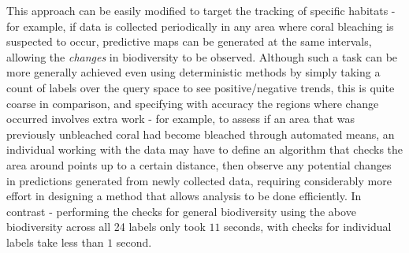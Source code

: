 This approach can be easily modified to target the tracking of specific habitats - for example, if data is collected periodically in any area where coral bleaching is suspected to occur, predictive maps can be generated at the same intervals, allowing the \textit{changes} in biodiversity to be observed. Although such a task can be more generally achieved even using deterministic methods by simply taking a count of labels over the query space to see positive/negative trends, this is quite coarse in comparison, and specifying with accuracy the regions where change occurred involves extra work - for example, to assess if an area that was previously unbleached coral had become bleached through automated means, an individual working with the data may have to define an algorithm that checks the area around points up to a certain distance, then observe any potential changes in predictions generated from newly collected data, requiring considerably more effort in designing a method that allows analysis to be done efficiently. In contrast - performing the checks for general biodiversity using the above biodiversity across all 24 labels only took $11$ seconds, with checks for individual labels take less than $1$ second.

